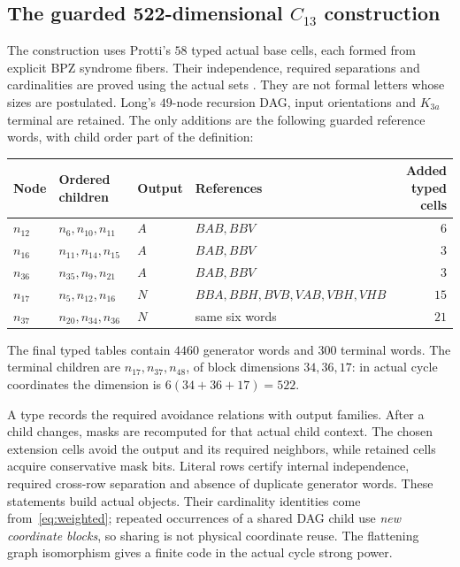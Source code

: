 \documentclass[11pt,a4paper]{article}
\theoremstyle{definition}
\theoremstyle{remark}
\newcommand{\code}[1]{\texttt{\detokenize{#1}}}
\begin{document}
\subsection{The guarded 522-dimensional \texorpdfstring{$C_{13}$}{C13} construction}
The construction uses Protti's $58$ typed actual base cells, each
formed from explicit BPZ syndrome fibers. Their independence, required
separations and cardinalities are proved using the actual sets
\code{BaseC13.Pre}. They are not formal letters whose sizes are
postulated. Long's $49$-node recursion DAG, input orientations and
$K_{3a}$ terminal are retained. The only additions are the following
guarded reference words, with child order part of the definition:
\begin{center}\small
\begin{tabular}{@{}llllr@{}}
\toprule
Node & Ordered children & Output & References & Added typed cells\\
\midrule
$n_{12}$ & $n_6,n_{10},n_{11}$ & $A$ & $BAB,BBV$ & $6$\\
$n_{16}$ & $n_{11},n_{14},n_{15}$ & $A$ & $BAB,BBV$ & $3$\\
$n_{36}$ & $n_{35},n_9,n_{21}$ & $A$ & $BAB,BBV$ & $3$\\
$n_{17}$ & $n_5,n_{12},n_{16}$ & $N$ & $BBA,BBH,BVB,VAB,VBH,VHB$ & $15$\\
$n_{37}$ & $n_{20},n_{34},n_{36}$ & $N$ & same six words & $21$\\
\bottomrule
\end{tabular}
\end{center}
The final typed tables contain $4460$ generator words and $300$
terminal words. The terminal children are $n_{17},n_{37},n_{48}$,
of block dimensions $34,36,17$: in actual cycle coordinates the
dimension is $6(34+36+17)=522$.

A type records the required avoidance relations with output families.
After a child changes, masks are recomputed for that actual child
context. The chosen extension cells avoid the output and its required
neighbors, while retained cells acquire conservative mask bits.
Literal rows certify internal independence, required cross-row
separation and absence of duplicate generator words. These statements
build actual \code{Realisation.multiSubst} objects. Their cardinality
identities come from~\eqref{eq:weighted}; repeated occurrences of a
shared DAG child use \emph{new coordinate blocks}, so sharing is not
physical coordinate reuse. The flattening graph isomorphism gives a
finite code in the actual cycle strong power.
\end{document}
